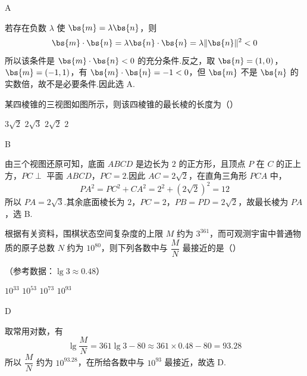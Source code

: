 \begin{answer}
A
\end{answer}

\begin{solution}
若存在负数 \(\lambda\) 使 \(\bs{m}=\lambda\bs{n}\)，则
\[
\bs{m}\cdot\bs{n}=\lambda\bs{n}\cdot\bs{n}=\lambda\lVert\bs{n}\rVert^2<0
\]
所以该条件是 \(\bs{m}\cdot\bs{n}<0\) 的充分条件.反之，取 \(\bs{n}=(1,0)\)，\(\bs{m}=(-1,1)\)，有 \(\bs{m}\cdot\bs{n}=-1<0\)，但 \(\bs{m}\) 不是 \(\bs{n}\) 的实数倍，故不是必要条件.因此选 A.
\end{solution}

\begin{problem}
某四棱锥的三视图如图所示，则该四棱锥的最长棱的长度为（\quad）


\choices
    {\(3\sqrt2\)}
    {\(2\sqrt3\)}
    {\(2\sqrt2\)}
    {\(2\)}
\end{problem}

\begin{answer}
B
\end{answer}

\begin{solution}
由三个视图还原可知，底面 \(ABCD\) 是边长为 \(2\) 的正方形，且顶点 \(P\) 在 \(C\) 的正上方，\(PC\perp\) 平面 \(ABCD\)，\(PC=2\).因此 \(AC=2\sqrt2\)，在直角三角形 \(PCA\) 中，
\[
PA^2=PC^2+CA^2=2^2+(2\sqrt2)^2=12
\]
所以 \(PA=2\sqrt3\).其余底面棱长为 \(2\)，\(PC=2\)，\(PB=PD=2\sqrt2\)，故最长棱为 \(PA\)，选 B.
\end{solution}

\begin{problem}
根据有关资料，围棋状态空间复杂度的上限 \(M\) 约为 \(3^{361}\)，而可观测宇宙中普通物质的原子总数 \(N\) 约为 \(10^{80}\)，则下列各数中与 \(\dfrac{M}{N}\) 最接近的是（\quad）

（参考数据：\(\lg 3\approx 0.48\)）

\choices
    {\(10^{33}\)}
    {\(10^{53}\)}
    {\(10^{73}\)}
    {\(10^{93}\)}
\end{problem}

\begin{answer}
D
\end{answer}

\begin{solution}
取常用对数，有
\[
\lg\frac{M}{N}=361\lg3-80\approx361\times0.48-80=93.28
\]
所以 \(\dfrac{M}{N}\) 约为 \(10^{93.28}\)，在所给各数中与 \(10^{93}\) 最接近，故选 D.
\end{solution}

